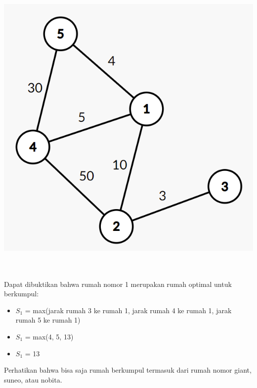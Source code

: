 \documentclass{article}
\begin{document}
\centerline{\includegraphics[height=6in]{mencari-tempat-perkumpulan.png}}

Dapat dibuktikan bahwa rumah nomor 1 merupakan rumah optimal untuk berkumpul:

\begin{center}
    \begin{itemize}
        \item $S_1$ = max(jarak rumah 3 ke rumah 1, jarak rumah 4 ke rumah 1, jarak rumah 5 ke rumah 1)
        \item $S_1$ = max(4, 5, 13)
        \item $S_1$ = 13
    \end{itemize}
\end{center}

Perhatikan bahwa bisa saja rumah berkumpul termasuk dari rumah nomor giant, suneo, atau nobita.
\end{document}
